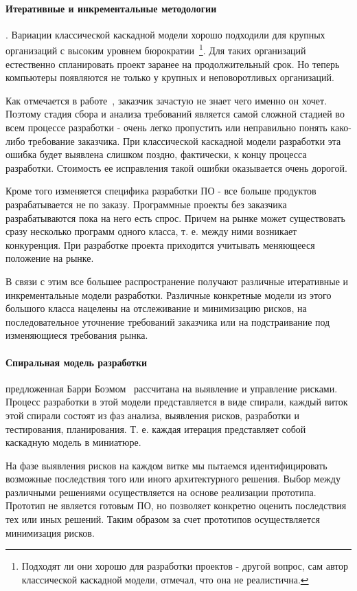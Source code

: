 \paragraph{Итеративные и инкрементальные методологии}. Вариации классической каскадной модели хорошо подходили для крупных организаций с высоким уровнем бюрократии~\footnote{Подходят ли они хорошо для разработки проектов - другой вопрос, сам автор классической каскадной модели, отмечал, что она не реалистична.}. Для таких организаций естественно спланировать проект заранее на продолжительный срок. Но теперь компьютеры появляются не только у крупных и неповоротливых организаций.

Как отмечается в работе~\cite{Brooks:1987:NSB}, заказчик зачастую не знает чего именно он хочет. Поэтому стадия сбора и анализа требований является самой сложной стадией во всем процессе разработки - очень легко пропустить или неправильно понять како-либо требование заказчика. При классической каскадной модели разработки эта ошибка будет выявлена слишком поздно, фактически, к концу процесса разработки. Стоимость ее исправления такой ошибки оказывается очень дорогой.

Кроме того изменяется специфика разработки ПО - все больше продуктов разрабатывается не по заказу. Программные проекты без заказчика разрабатываются пока на него есть спрос. Причем на рынке может существовать сразу несколько программ одного класса, т. е. между ними возникает конкуренция. При разработке проекта приходится учитывать меняющееся положение на рынке.

В связи с этим все большее распространение получают различные итеративные и инкрементальные модели разработки. Различные конкретные модели из этого большого класса нацелены на отслеживание и минимизацию рисков, на последовательное уточнение требований заказчика или на подстраивание под изменяющиеся требования рынка.

\paragraph{Спиральная модель разработки} предложенная Барри Боэмом~\cite{Boehm:1988:SMSD} рассчитана на выявление и управление рисками. Процесс разработки в этой модели представляется в виде спирали, каждый виток этой спирали состоят из фаз анализа, выявления рисков, разработки и тестирования, планирования. Т. е. каждая итерация представляет собой каскадную модель в миниатюре.

На фазе выявления рисков на каждом витке мы пытаемся идентифицировать возможные последствия того или иного архитектурного решения. Выбор между различными решениями осуществляется на основе реализации прототипа. Прототип не является готовым ПО, но позволяет конкретно оценить последствия тех или иных решений. Таким образом за счет прототипов осуществляется минимизация рисков.

